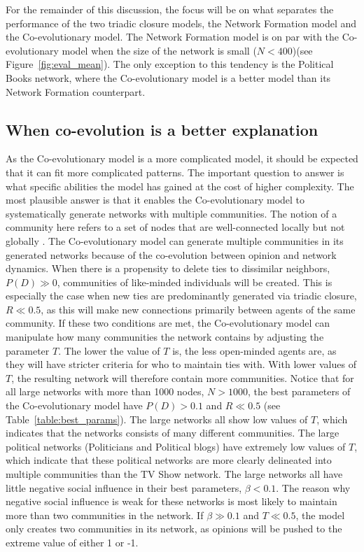 \documentclass[11pt]{article}
\begin{document}
\noindent For the remainder of this discussion, the focus will be on what separates the performance of the two triadic closure models, the Network Formation model and the Co-evolutionary model. 
The Network Formation model is on par with the Co-evolutionary model when the size of the network is small ($N < 400$)(see Figure~\ref{fig:eval_mean}). The only exception to this tendency is the Political Books network, where the Co-evolutionary model is a better model than its Network Formation counterpart.

\subsection{When co-evolution is a better explanation}
As the Co-evolutionary model is a more complicated model, it should be expected that it can fit more complicated patterns. The important question to answer is what specific abilities the model has gained at the cost of higher complexity.
The most plausible answer is that it enables the Co-evolutionary model to systematically generate networks with multiple communities. The notion of a community here refers to a set of nodes that are well-connected locally but not globally \cite{yang2011detecting}. The Co-evolutionary model can generate multiple communities in its generated networks because of the co-evolution between opinion and network dynamics. 
When there is a propensity to delete ties to dissimilar neighbors, $P(D) \gg 0$, communities of like-minded individuals will be created. This is especially the case when new ties are predominantly generated via triadic closure, $R \ll 0.5$, as this will make new connections primarily between agents of the same community. 
If these two conditions are met, the Co-evolutionary model can manipulate how many communities the network contains by adjusting the parameter $T$. 
The lower the value of $T$ is, the less open-minded agents are, as they will have stricter criteria for who to maintain ties with. With lower values of $T$, the resulting network will therefore contain more communities. Notice that for all large networks with more than 1000 nodes, $N > 1000$, the best parameters of the Co-evolutionary model have $P(D) > 0.1$ and $R \ll 0.5$ (see Table~\ref{table:best_params}). The large networks all show low values of $T$, which indicates that the networks consists of many different communities. The large political networks (Politicians and Political blogs) have extremely low values of $T$, which indicate that these political networks are more clearly delineated into multiple communities than the TV Show network. The large networks all have little negative social influence in their best parameters, $\beta < 0.1$. The reason why negative social influence is weak for these networks is most likely to maintain more than two communities in the network. If $\beta \gg 0.1$ and $T \ll 0.5$, the model only creates two communities in its network, as opinions will be pushed to the extreme value of either 1 or -1. 
\end{document}
